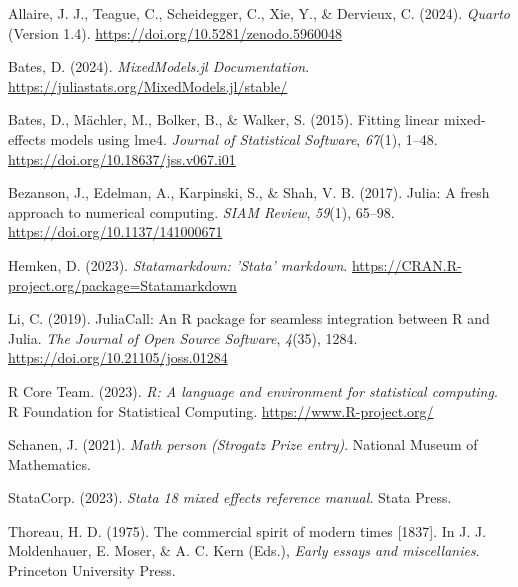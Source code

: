 \documentclass[
  letterpaper,
  DIV=11,
  numbers=noendperiod]{scrreprt}
\newlength{\cslhangindent}
\newenvironment{CSLReferences}[2] %
 {\begin{list}{}{%
  \setlength{\itemindent}{0pt}
  \setlength{\leftmargin}{0pt}
  \setlength{\parsep}{0pt}
  \ifodd #1
   \setlength{\leftmargin}{\cslhangindent}
   \setlength{\itemindent}{-1\cslhangindent}
  \fi
  \setlength{\itemsep}{#2\baselineskip}}}
 {\end{list}}
\begin{document}

\label{refs}
\begin{CSLReferences}{1}{0}
Allaire, J. J., Teague, C., Scheidegger, C., Xie, Y., \& Dervieux, C.
(2024). \emph{{Quarto}} (Version 1.4).
\url{https://doi.org/10.5281/zenodo.5960048}

Bates, D. (2024). \emph{{MixedModels.jl Documentation}}.
\url{https://juliastats.org/MixedModels.jl/stable/}

Bates, D., Mächler, M., Bolker, B., \& Walker, S. (2015). Fitting linear
mixed-effects models using lme4. \emph{Journal of Statistical Software},
\emph{67}(1), 1--48. \url{https://doi.org/10.18637/jss.v067.i01}

Bezanson, J., Edelman, A., Karpinski, S., \& Shah, V. B. (2017). Julia:
A fresh approach to numerical computing. \emph{SIAM Review},
\emph{59}(1), 65--98. \url{https://doi.org/10.1137/141000671}

Hemken, D. (2023). \emph{Statamarkdown: 'Stata' markdown}.
\url{https://CRAN.R-project.org/package=Statamarkdown}

Li, C. (2019). {JuliaCall}: An {R} package for seamless integration
between {R} and {Julia}. \emph{The Journal of Open Source Software},
\emph{4}(35), 1284. \url{https://doi.org/10.21105/joss.01284}

R Core Team. (2023). \emph{R: A language and environment for statistical
computing}. R Foundation for Statistical Computing.
\url{https://www.R-project.org/}

Schanen, J. (2021). \emph{Math person ({Strogatz Prize} entry)}.
National Museum of Mathematics.

StataCorp. (2023). \emph{Stata 18 mixed effects reference manual}. Stata
Press.

Thoreau, H. D. (1975). The commercial spirit of modern times {[}1837{]}.
In J. J. Moldenhauer, E. Moser, \& A. C. Kern (Eds.), \emph{Early essays
and miscellanies}. Princeton University Press.

\end{CSLReferences}
\end{document}
